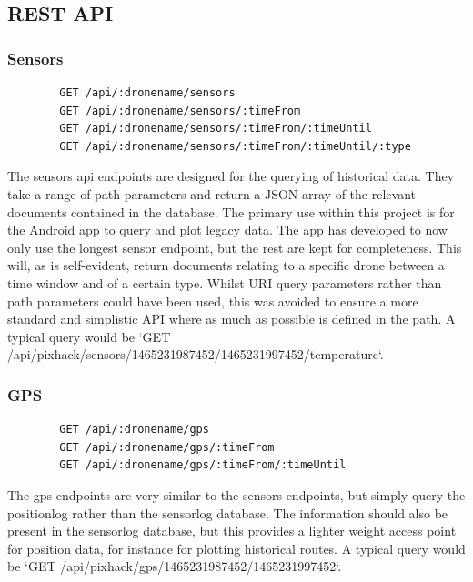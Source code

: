 \documentclass{article}
\begin{document}
\subsection{REST API} \label{apdxRestApi}
\subsubsection{Sensors}
\begin{center}
	\begin{lstlisting}
		GET /api/:dronename/sensors
		GET /api/:dronename/sensors/:timeFrom
		GET /api/:dronename/sensors/:timeFrom/:timeUntil
		GET /api/:dronename/sensors/:timeFrom/:timeUntil/:type
	\end{lstlisting}
\end{center}
The sensors api endpoints are designed for the querying of historical data. They take a range of path parameters and return a JSON array of the relevant documents contained in the database. The primary use within this project is for the Android app to query and plot legacy data. The app has developed to now only use the longest sensor endpoint, but the rest are kept for completeness. This will, as is self-evident, return documents relating to a specific drone between a time window and of a certain type. Whilst URI query parameters rather than path parameters could have been used, this was avoided to ensure a more standard and simplistic API where as much as possible is defined in the path. A typical query would be `GET /api/pixhack/sensors/1465231987452/1465231997452/temperature`.

\subsubsection{GPS}
\begin{center}
	\begin{lstlisting}
		GET /api/:dronename/gps
		GET /api/:dronename/gps/:timeFrom
		GET /api/:dronename/gps/:timeFrom/:timeUntil
	\end{lstlisting}
\end{center}
The gps endpoints are very similar to the sensors endpoints, but simply query the positionlog rather than the sensorlog database. The information should also be present in the sensorlog database, but this provides a lighter weight access point for position data, for instance for plotting historical routes. A typical query would be `GET /api/pixhack/gps/1465231987452/1465231997452`.
\end{document}
